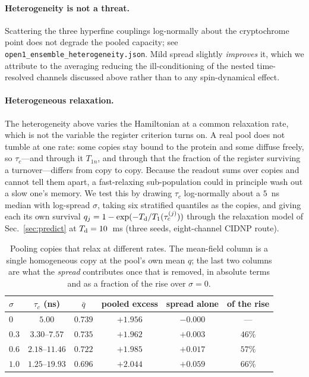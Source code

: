 \documentclass[aps,prx,reprint,superscriptaddress,nofootinbib,floatfix]{revtex4-2}
\begin{document}
\paragraph*{Heterogeneity is not a threat.} Scattering the three hyperfine
couplings log-normally about the cryptochrome point does not degrade the pooled
capacity; see \texttt{open1\_ensemble\_heterogeneity.json}. Mild spread slightly
\emph{improves} it, which we attribute to the averaging reducing the
ill-conditioning of the nested time-resolved channels discussed above rather than
to any spin-dynamical effect.

\paragraph*{Heterogeneous relaxation.} The heterogeneity above varies the
Hamiltonian at a common relaxation rate, which is not the variable the register
criterion turns on. A real pool does not tumble at one rate: some copies stay
bound to the protein and some diffuse freely, so $\tau_c$---and through it
$T_{1n}$, and through that the fraction of the register surviving a
turnover---differs from copy to copy. Because the readout sums over copies and
cannot tell them apart, a fast-relaxing sub-population could in principle wash
out a slow one's memory. We test this by drawing $\tau_c$ log-normally about a
$5$~ns median with log-spread $\sigma$, taking six stratified quantiles as the
copies, and giving each its own survival $q_j=1-\exp(-T_{\rm d}/T_1(\tau_c^{(j)}))$
through the relaxation model of Sec.~\ref{sec:predict} at $T_{\rm d}=10$~ms
(three seeds, eight-channel CIDNP route).

\begin{table}[H]
\caption{\label{tab:tauchet}Pooling copies that relax at different rates. The
mean-field column is a single homogeneous copy at the pool's own mean $q$; the
last two columns are what the \emph{spread} contributes once that is removed, in
absolute terms and as a fraction of the rise over $\sigma=0$.}
\begin{ruledtabular}
\begin{tabular}{lccccc}
$\sigma$ & $\tau_c$ (ns) & $\bar q$ & pooled excess & spread alone & of the rise \\
\hline
$0$ & $5.00$ & $0.739$ & $+1.956$ & $-0.000$ & --- \\
$0.3$ & $3.30$--$7.57$ & $0.735$ & $+1.962$ & $+0.003$ & $46\%$ \\
$0.6$ & $2.18$--$11.46$ & $0.722$ & $+1.985$ & $+0.017$ & $57\%$ \\
$1.0$ & $1.25$--$19.93$ & $0.696$ & $+2.044$ & $+0.059$ & $66\%$ \\
\end{tabular}
\end{ruledtabular}
\end{table}
\end{document}
